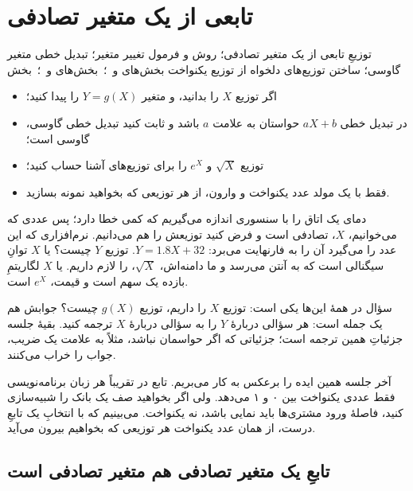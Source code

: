 \chapter{تابعی از یک متغیر تصادفی}
\label{ch:s10}

{توزیعِ تابعی از یک متغیر تصادفی؛ روش  و فرمول تغییر متغیر؛ تبدیل خطی متغیر گاوسی؛ ساختن توزیع‌های دلخواه از توزیع یکنواخت}
{ بخش‌های  و  \,؛\,  بخش‌های  و  \,؛\,  بخش }
{\begin{itemize}
  \item اگر توزیع $X$ را بدانید،  و  متغیر $Y=g(X)$ را پیدا کنید؛
  \item در تبدیل خطی $aX+b$ حواستان به علامت $a$ باشد و ثابت کنید تبدیل خطی گاوسی، گاوسی است؛
  \item توزیع $\sqrt X$ و $e^X$ را برای توزیع‌های آشنا حساب کنید؛
  \item فقط با یک مولد عدد یکنواخت و  وارون، از هر توزیعی که بخواهید نمونه بسازید.
\end{itemize}}

دمای یک اتاق را با سنسوری اندازه می‌گیریم که کمی خطا دارد؛ پس عددی که می‌خوانیم، $X$، تصادفی است و فرض کنید توزیعش را هم می‌دانیم. نرم‌افزاری که این عدد را می‌گیرد آن را به فارنهایت می‌برد: $Y=1.8X+32$. توزیع $Y$ چیست؟ یا $X$ توانِ سیگنالی است که به آنتن می‌رسد و ما دامنه‌اش، $\sqrt X$، را لازم داریم. یا $X$ لگاریتمِ بازده یک سهم است و قیمت، $e^X$ است.

سؤال در همهٔ این‌ها یکی است: توزیع $X$ را داریم، توزیع $g(X)$ چیست؟ جوابش هم یک جمله است: هر سؤالی دربارهٔ $Y$ را به سؤالی دربارهٔ $X$ ترجمه کنید. بقیهٔ جلسه جزئیاتِ همین ترجمه است؛ جزئیاتی که اگر حواسمان نباشد، مثلاً به علامت یک ضریب، جواب را خراب می‌کنند.

آخر جلسه همین ایده را برعکس به کار می‌بریم. تابع  در تقریباً هر زبان برنامه‌نویسی فقط عددی یکنواخت بین ۰ و ۱ می‌دهد. ولی اگر بخواهید صف یک بانک را شبیه‌سازی کنید، فاصلهٔ ورود مشتری‌ها باید نمایی باشد، نه یکنواخت. می‌بینیم که با انتخابِ یک تابعِ درست، از همان عدد یکنواخت هر توزیعی که بخواهیم بیرون می‌آید.

\section{تابعِ یک متغیر تصادفی هم متغیر تصادفی است}
\label{sec:functions}

